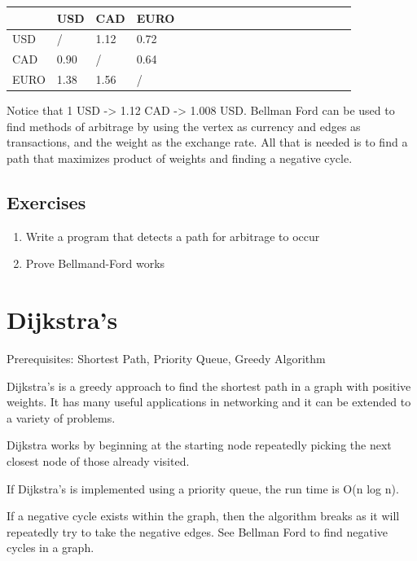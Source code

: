 \documentclass[11pt,oneside]{book}
\begin{document}
\vspace{10pt} \begin{tabular}{|l|l|l|l|l|l|l|l|l|l|l|l|l|l|l|l|l|l|l}\hline


   &
  USD &
  CAD &
  EURO\\
\hline


  USD &
  / &
  1.12 &
  0.72\\

  CAD &
  0.90 &
  / &
  0.64\\

  EURO &
  1.38 &
  1.56 &
  /\\

\hline\end{tabular}

Notice that 1 USD -> 1.12 CAD -> 1.008 USD. Bellman Ford can be used to find methods of arbitrage by using the vertex as currency and edges as transactions, and the weight as the exchange rate. All that is needed is to find a path that maximizes product of weights and finding a negative cycle.

\subsection{Exercises}

\begin{enumerate}
\item Write a program that detects a path for arbitrage to occur
\item Prove Bellmand-Ford works
\end{enumerate}
\section{Dijkstra's}

Prerequisites:  Shortest Path, Priority Queue, Greedy Algorithm

Dijkstra's is a greedy approach to find the shortest path in a graph with positive weights. It has many useful applications in networking and it can be extended to a variety of problems.

Dijkstra works by beginning at the starting node repeatedly picking the next closest node of those already visited.

If Dijkstra's is implemented using a priority queue, the run time is O(n log n).

If a negative cycle exists within the graph, then the algorithm breaks as it will repeatedly try to take the negative edges. See Bellman Ford to find negative cycles in a graph.
\end{document}
